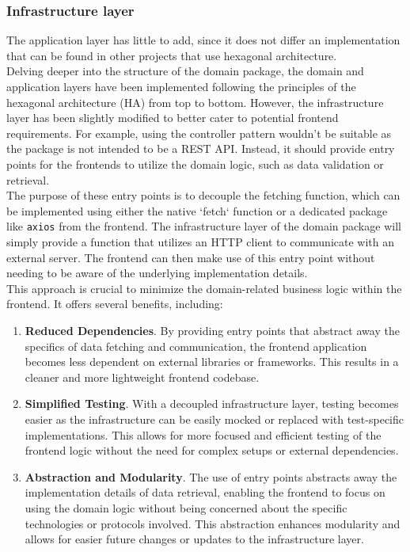 \documentclass[../design.tex]{subfiles}
\begin{document}
\subsubsection{Infrastructure layer}
The application layer has little to add, since it does not differ an
implementation that can be found in other projects that use hexagonal
architecture.
\\[8pt]
Delving deeper into the structure of the domain package, the domain and
application layers have been implemented following the principles of the
hexagonal architecture (HA) from top to bottom. However, the infrastructure
layer has been slightly modified to better cater to potential frontend
requirements. For example, using the controller pattern wouldn't be suitable as
the package is not intended to be a REST API. Instead, it should provide entry
points for the frontends to utilize the domain logic, such as data validation or
retrieval.
\\
The purpose of these entry points is to decouple the fetching function, which
can be implemented using either the native `fetch` function or a dedicated
package like \texttt{axios} from the frontend. The infrastructure layer of the
domain package will simply provide a function that utilizes an HTTP client to
communicate with an external server. The frontend can then make use of this
entry point without needing to be aware of the underlying implementation
details.
\\
This approach is crucial to minimize the domain-related business logic within
the frontend. It offers several benefits, including:
\begin{enumerate}
	\item\textbf{Reduced Dependencies}. By providing entry points that abstract away the
	specifics of data fetching and communication, the frontend application becomes
	less dependent on external libraries or frameworks. This results in a
	cleaner and more lightweight frontend codebase.
	\item\textbf{Simplified Testing}. With a decoupled infrastructure layer, testing
	becomes easier as the infrastructure can be easily mocked or replaced with
	test-specific implementations. This allows for more focused and efficient
	testing of the frontend logic without the need for complex setups or
	external dependencies.
	\item\textbf{Abstraction and Modularity}. The use of entry points abstracts away the
	implementation details of data retrieval, enabling the frontend to focus
	on using the domain logic without being concerned about the specific
	technologies or protocols involved. This abstraction enhances modularity
	and allows for easier future changes or updates to the infrastructure
	layer.
\end{enumerate}
\end{document}
